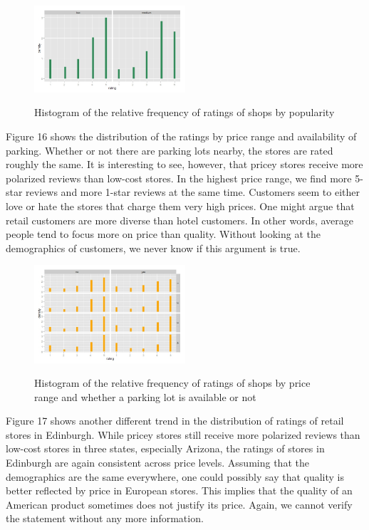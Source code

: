 \documentclass[11pt]{article}
\begin{document}
\begin{figure}[h!]
           \caption{Histogram of the relative frequency of ratings of shops by popularity}
	\centering
	\includegraphics[width=0.5\textwidth]{Figures/shopping1.jpeg}
           \label{shopping1}
\end{figure}

Figure 16 shows the distribution of the ratings by price range and availability of parking. Whether or not there are parking lots nearby, the stores are rated roughly the same. It is interesting to see, however, that pricey stores receive more polarized reviews than low-cost stores. In the highest price range, we find more 5-star reviews and more 1-star reviews at the same time. Customers seem to either love or hate the stores that charge them very high prices. One might argue that retail customers are more diverse than hotel customers. In other words, average people tend to focus more on price than quality. Without looking at the demographics of customers, we never know if this argument is true.

\begin{figure}[h]
           \caption{Histogram of the relative frequency of ratings of shops by price range and whether a parking lot is available or not}
	\centering
	\includegraphics[width=0.5\textwidth]{Figures/shopping2.jpeg}
           \label{shopping2}
\end{figure}

Figure 17 shows another different trend in the distribution of ratings of retail stores in Edinburgh. While pricey stores still receive more polarized reviews than low-cost stores in three states, especially Arizona, the ratings of stores in Edinburgh are again consistent across price levels. Assuming that the demographics are the same everywhere, one could possibly say that quality is better reflected by price in European stores. This implies that the quality of an American product sometimes does not justify its price. Again, we cannot verify the statement without any more information.
\end{document}
